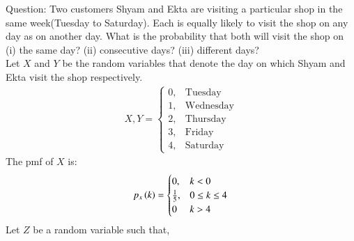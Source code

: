 \documentclass[journal,12pt,onecolumn]{IEEEtran}
\theoremstyle{remark}
\begin{document}
%
Question:
Two customers Shyam and Ekta are visiting a particular shop in the same week(Tuesday to Saturday). Each is equally likely to visit the shop on any day as on another day. What is the probability that both will visit the shop on (i) the same day? (ii) consecutive days? (iii) different days?
\\
\solution
Let $X$ and $Y$ be the random variables that denote the day on which Shyam and Ekta visit the shop respectively.
\begin{align}
X,Y = 
	\begin{cases}
		0, & \text{Tuesday}\\
		1, & \text{Wednesday}\\
		2, & \text{Thursday}\\
		3, & \text{Friday}\\
		4, & \text{Saturday}
	\end{cases}
\end{align}
The pmf of $X$ is:
\begin{align}
	p_x\left(k\right) =
	\begin{cases}
		0, & k < 0\\
		\frac{1}{5}, & 0 \leq k \leq 4\\
		0 & k > 4
	\end{cases}
\end{align}
Let $Z$ be a random variable such that,
\end{document}

